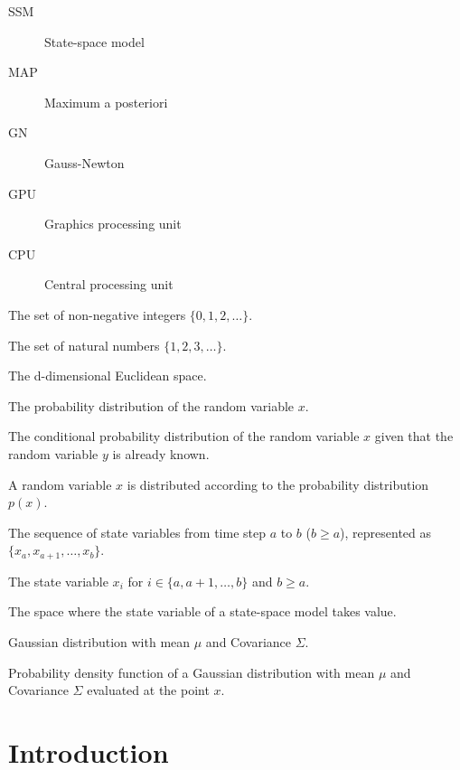 \documentclass[dissertation,math,vertlayout,pdfa,colorlinks,nologo]{aaltoseries}
\begin{document}
\begin{description}
\item[SSM] State-space model
\item[MAP] Maximum a posteriori 
\item[GN] Gauss-Newton
\item[GPU] Graphics processing unit
\item[CPU] Central processing unit
\end{description}
\symbols
\begin{description}[style=multiline,leftmargin=2cm,font=\normalfont]
    \item[$\mathbb{N}_0$] The set of non-negative integers $\{0, 1, 2, \ldots\}$.
    \item[$\mathbb{N}$] The set of natural numbers $\{1, 2, 3, \ldots\}$.
    \item[$\mathbb{R}^d$] The d-dimensional Euclidean space.
    \item[$p(x)$] The probability distribution of the random variable $x$.
    \item[$p(x \mid y)$] The conditional probability distribution of the random variable $x$ given that the random variable $y$ is already known.
    \item[$x \sim p(x)$] A random variable $x$ is distributed according to the probability distribution $p(x)$.
    \item[$x_{a:b}$] The sequence of state variables from time step $a$ to $b$ ($b \geq a$), represented as $\{x_a, x_{a+1}, \dots, x_b\}$.
    \item[$(x_i)_{i = a}^b$] The state variable $x_i$ for $i \in \{a, a+1, \ldots, b\}$ and $b \geq a$.
    \item[$X$] The space where the state variable of a state-space model takes value. 
    \item[$\mathcal{N}(\mu, \, \Sigma)$] Gaussian distribution with mean $\mu$ and Covariance $\Sigma$.
    \item[$\mathcal{N}(x; \,  \mu, \, \Sigma)$]  Probability density function of a Gaussian distribution with mean $\mu$ and Covariance $\Sigma$ evaluated at the point $x$.
\end{description}


\chapter{Introduction}
\label{ch1:introduction}
\end{document}
